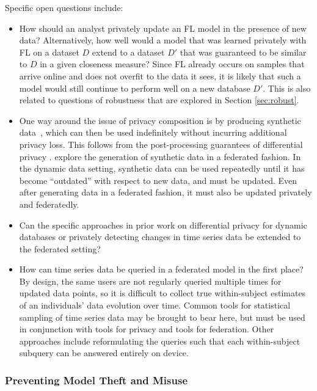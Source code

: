 \documentclass[11pt]{article}
\begin{document}
Specific open questions include:
\begin{itemize}
    \item How should an analyst privately update an FL model in the presence of new data? Alternatively, how well would a model that was learned privately with FL on a dataset $D$ extend to a dataset $D'$ that was guaranteed to be similar to $D$ in a given closeness measure?  Since FL already occurs on samples that arrive online and does not overfit to the data it sees, it is likely that such a model would still continue to perform well on a new database $D'$.  
    This is also related to questions of robustness that are explored in Section \ref{sec:robust}.
    \item One way around the issue of privacy composition is by producing synthetic data~\cite{dwork2014algorithmic,abay2018privacy}, which can then be used indefinitely without incurring additional privacy loss.  This follows from the post-processing guarantees of differential privacy \cite{DMNS06}.  \citet{augenstein2019generative} explore the generation of synthetic data in a federated fashion.  In the dynamic data setting, synthetic data can be used repeatedly until it has become ``outdated'' with respect to new data, and must be updated.  Even after generating data in a federated fashion, it must also be updated privately and federatedly.
    \item Can the specific approaches in prior work on differential privacy for dynamic databases \cite{CKLT18} or privately detecting changes in time series data \cite{CKM+18, CKM+18b} be extended to the federated setting?
    \item How can time series data be queried in a federated model in the first place?  By design, the same users are not regularly queried multiple times for updated data points, so it is difficult to collect true within-subject estimates of an individuals' data evolution over time. Common tools for statistical sampling of time series data may be brought to bear here, but must be used in conjunction with tools for privacy and tools for federation.  Other approaches include reformulating the queries such that each within-subject subquery can be answered entirely on device.
\end{itemize}

\subsubsection{Preventing Model Theft and Misuse}
\label{sssec:model_theft}
\end{document}

